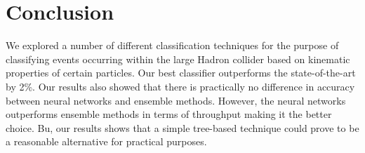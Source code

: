 \section{Conclusion}
\label{sec:conclusion}

We explored a number of different classification techniques for the purpose of classifying events occurring within the large Hadron collider based on kinematic properties of certain particles. Our best classifier outperforms the state-of-the-art by 2\%. Our results also showed that there is practically no difference in accuracy between neural networks and ensemble methods. However, the neural networks outperforms ensemble methods in terms of throughput making it the better choice. Bu, our results shows that a simple tree-based technique could prove to be a reasonable alternative for practical purposes.